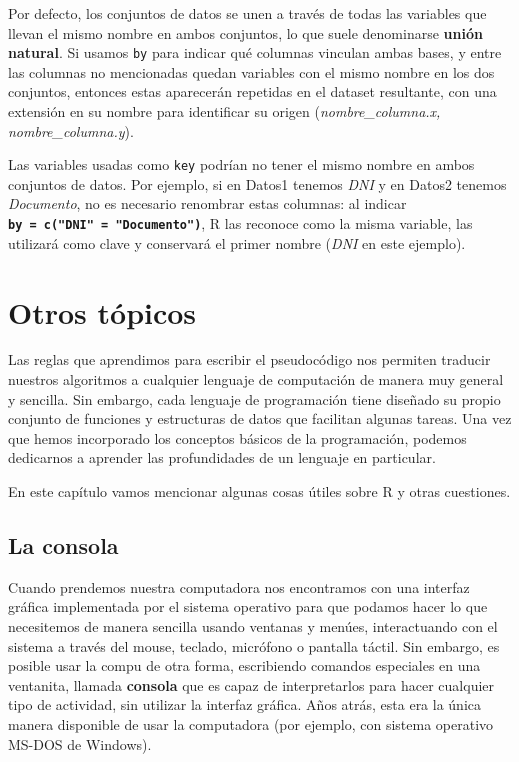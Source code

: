 \documentclass[
]{book}
\begin{document}
Por defecto, los conjuntos de datos se unen a través de todas las variables que llevan el mismo nombre en ambos conjuntos, lo que suele denominarse \textbf{unión natural}. Si usamos \texttt{by} para indicar qué columnas vinculan ambas bases, y entre las columnas no mencionadas quedan variables con el mismo nombre en los dos conjuntos, entonces estas aparecerán repetidas en el dataset resultante, con una extensión en su nombre para identificar su origen (\emph{nombre\_columna.x, nombre\_columna.y}).

Las variables usadas como \texttt{key} podrían no tener el mismo nombre en ambos conjuntos de datos. Por ejemplo, si en Datos1 tenemos \emph{DNI} y en Datos2 tenemos \emph{Documento}, no es necesario renombrar estas columnas: al indicar \textbf{\texttt{by\ =\ c("DNI"\ =\ "Documento")}}, R las reconoce como la misma variable, las utilizará como clave y conservará el primer nombre (\emph{DNI} en este ejemplo).

\hypertarget{otros-tuxf3picos}{%
\chapter{Otros tópicos}\label{otros-tuxf3picos}}

Las reglas que aprendimos para escribir el pseudocódigo nos permiten traducir nuestros algoritmos a cualquier lenguaje de computación de manera muy general y sencilla. Sin embargo, cada lenguaje de programación tiene diseñado su propio conjunto de funciones y estructuras de datos que facilitan algunas tareas. Una vez que hemos incorporado los conceptos básicos de la programación, podemos dedicarnos a aprender las profundidades de un lenguaje en particular.

En este capítulo vamos mencionar algunas cosas útiles sobre R y otras cuestiones.

\hypertarget{la-consola}{%
\section{La consola}\label{la-consola}}

Cuando prendemos nuestra computadora nos encontramos con una interfaz gráfica implementada por el sistema operativo para que podamos hacer lo que necesitemos de manera sencilla usando ventanas y menúes, interactuando con el sistema a través del mouse, teclado, micrófono o pantalla táctil. Sin embargo, es posible usar la compu de otra forma, escribiendo comandos especiales en una ventanita, llamada \textbf{consola} que es capaz de interpretarlos para hacer cualquier tipo de actividad, sin utilizar la interfaz gráfica. Años atrás, esta era la única manera disponible de usar la computadora (por ejemplo, con sistema operativo MS-DOS de Windows).
\end{document}
